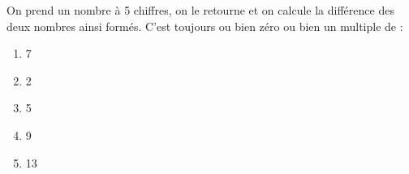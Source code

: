 On prend un nombre à 5 chiffres, on le retourne et on calcule la
différence des deux nombres ainsi formés. C'est toujours ou bien zéro
ou bien un multiple de :
\begin{multicols}{5}
  \begin{enumerate}[A/]
  \item 7
  \item 2
  \item 5
  \item 9
  \item 13
  \end{enumerate}
\end{multicols}